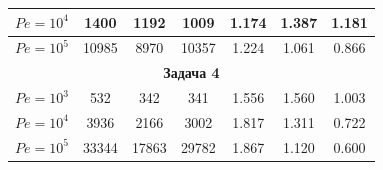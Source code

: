 \begin{center}
\begin{tabular}{|c|c|c|c|c|c|c|}
\hline 


$Pe=10^4$ & 1400 & 1192 & 1009 & 1.174 & 1.387 & 1.181 \\ 


\hline 


$Pe=10^5$ & 10985 & 8970 & 10357 & 1.224 & 1.061 & 0.866 \\ 


\hline 


\multicolumn{7}{|c|}{\bf Задача 4} \\ 


\hline 


$Pe=10^3$ & 532 & 342 & 341 & 1.556 & 1.560 & 1.003 \\ 


\hline 


$Pe=10^4$ & 3936 & 2166 & 3002 & 1.817 & 1.311 & 0.722 \\ 


\hline 


$Pe=10^5$ & 33344 & 17863 & 29782 & 1.867 & 1.120 & 0.600 \\ 


\hline 


\end{tabular} 


\end{center} 


\medskip 


 


